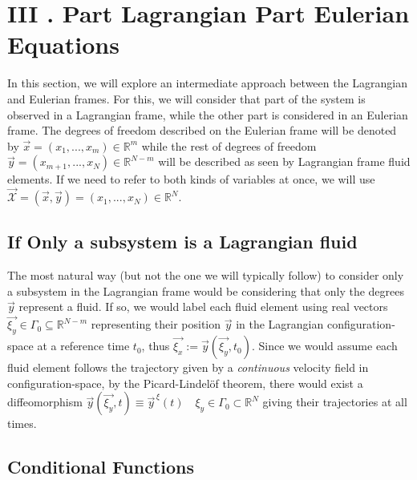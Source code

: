 \documentclass[11pt, a4paper]{article} %
\newcommand{\R}{\mathbb{R}} %
\newcommand{\x}{\mathcal{X}}
\begin{document}
\section*{III . Part Lagrangian Part Eulerian Equations \vspace{-0.2cm}}
In this section, we will explore an intermediate approach between the Lagrangian and Eulerian frames. For this, we will consider that part of the system is observed in a Lagrangian frame, while the other part is considered in an Eulerian frame. The degrees of freedom described on the Eulerian frame will be denoted by $\vec{x}=(x_1,...,x_m)\in\R^m$ while the rest of degrees of freedom $\vec{y}=(x_{m+1},...,x_N)\in\R^{N-m}$ will be described as seen by Lagrangian frame fluid elements. If we need to refer to both kinds of variables at once, we will use $\vec{\x}=(\vec{x}, \vec{y})=(x_1,...,x_N)\in \R^N$.\vspace{-0.4cm}

\subsection*{If Only a subsystem is a Lagrangian fluid\vspace{-0.3cm}}

The most natural way (but not the one we will typically follow) to consider only a subsystem in the Lagrangian frame would be considering that only the degrees $\vec{y}$ represent a fluid. If so, we would label each fluid element using real vectors $\vec{\xi_y}\in\Gamma_0\subseteq \R^{N-m}$ representing their position $\vec{y}$ in the Lagrangian configuration-space at a reference time $t_0$, thus $\vec{\xi_x}:=\vec{y}( \vec{\xi_y},t_0)$. Since we would assume each fluid element follows the trajectory given by a {\em continuous} velocity field in configuration-space, by the Picard-Lindelöf theorem, there would exist a diffeomorphism $\vec{y}(\vec{\xi_y},t)\equiv \vec{y}^{\, \xi}(t) \quad \xi_y \in \Gamma_0 \subset \R^N$ giving their trajectories at all times. \vspace{-0.4cm}

\subsection*{Conditional Functions\vspace{-0.3cm}}
\end{document}
